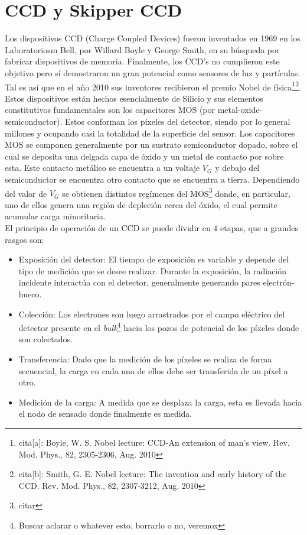 \section{CCD y Skipper CCD}
\noindent Los dispositivos CCD (Charge Coupled Devices) fueron inventados en 1969 en los Laboratoriosm Bell, por Willard Boyle y George Smith, en su búsqueda por fabricar dispositivos de memoria. Finalmente, los CCD's no cumplieron este objetivo pero sí demostraron un gran potencial como sensores de luz y partículas. Tal es así que en el año 2010 sus inventores recibieron el premio Nobel de física\footnote{cita[a]: Boyle, W. S. Nobel lecture: CCD-An extension of man's view. Rev. Mod. Phys., 82, 2305-2306, Aug. 2010}\footnote{cita[b]: Smith, G. E. Nobel lecture: The invention and early history of the CCD. Rev. Mod. Phys., 82, 2307-3212, Aug. 2010}.\\
\indent Estos dispositivos están hechos esencialmente de Silicio y sus elementos constitutivos fundamentales son los capacitores MOS (por metal-oxide-semiconductor). Estos conforman los píxeles del detector, siendo por lo general millones y ocupando casi la totalidad de la superficie del sensor. Los capacitores MOS se componen generalmente por un sustrato semiconductor dopado, sobre el cual se deposita una delgada capa de óxido y un metal de contacto por sobre esta. Este contacto metálico se encuentra a un voltaje $V_{G}$ y debajo del semiconductor se encuentra otro contacto que se encuentra a tierra. Dependiendo del valor de $V_{G}$ se obtienen distintos regímenes del MOS\footnote{citar} donde, en particular, uno de ellos genera una región de depleción cerca del óxido, el cual permite acumular carga minoritaria.\\
\indent El principio de operación de un CCD se puede dividir en $4$ etapas, que a grandes rasgos son:
\begin{itemize}
    \item Exposición del detector: El tiempo de exposición es variable y depende del tipo de medición que se desee realizar. Durante la exposición, la radiación incidente interactúa con el detector, generalmente generando pares electrón-hueco. 
    \item Colección: Los electrones son luego arrastrados por el campo eléctrico del detector presente en el \textit{bulk}\footnote{Buscar aclarar o whatever esto, borrarlo o no, veremox} hacia los pozos de potencial de los píxeles donde son colectados.
    \item Transferencia: Dado que la medición de los píxeles se realiza de forma secuencial, la carga en cada uno de ellos debe ser transferida de un píxel a otro.
    \item Medición de la carga: A medida que se desplaza la carga, esta es llevada hacia el nodo de sensado donde finalmente es medida.
\end{itemize}
